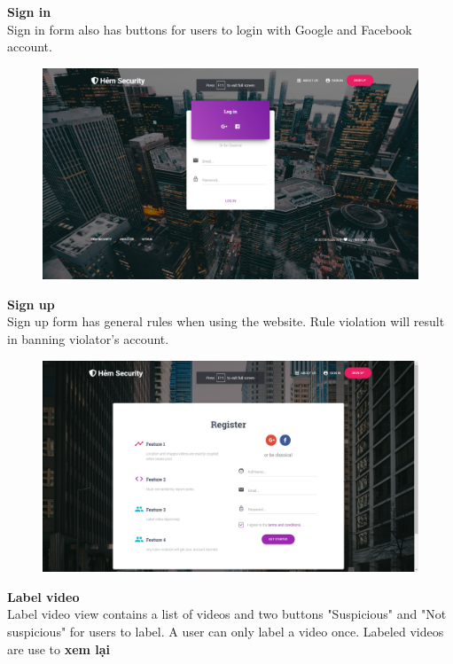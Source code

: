 \textbf{Sign in}
\\
Sign in form also has buttons for users to login with Google and Facebook account.
\begin{center}
    \begin{figure}[H]
    \centering
    \includegraphics[width=1\columnwidth]{images/chap4/login_form.png}
    \end{figure}
\end{center}
\textbf{Sign up}
\\
Sign up form has general rules when using the website. Rule violation will result in banning violator's account.
\begin{center}
    \begin{figure}[H]
    \centering
    \includegraphics[width=1\columnwidth]{images/chap4/signup_form.png}
    \end{figure}
\end{center}
\textbf{Label video}
\\
Label video view contains a list of videos and two buttons "Suspicious" and "Not suspicious" for users to label. A user can only label a video once. Labeled videos are use to \textbf{xem lại}
